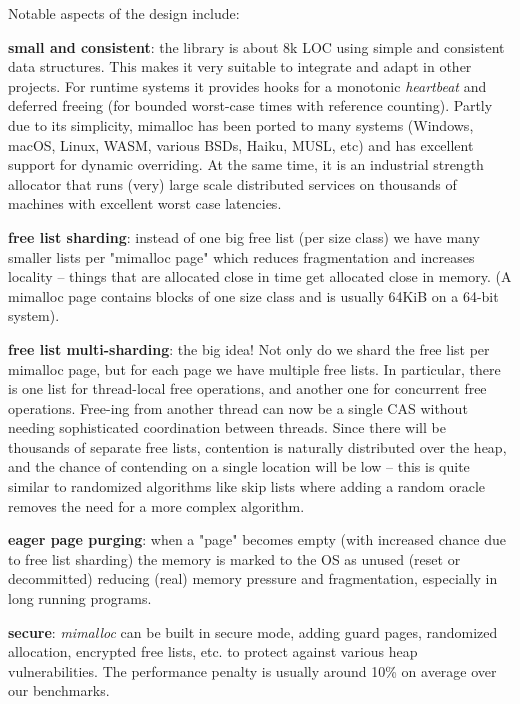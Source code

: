 Notable aspects of the design include\+:
\begin{DoxyItemize}
\item {\bfseries{small and consistent}}\+: the library is about 8k LOC using simple and consistent data structures. This makes it very suitable to integrate and adapt in other projects. For runtime systems it provides hooks for a monotonic {\itshape heartbeat} and deferred freeing (for bounded worst-\/case times with reference counting). Partly due to its simplicity, mimalloc has been ported to many systems (Windows, mac\+OS, Linux, WASM, various BSD\textquotesingle{}s, Haiku, MUSL, etc) and has excellent support for dynamic overriding. At the same time, it is an industrial strength allocator that runs (very) large scale distributed services on thousands of machines with excellent worst case latencies.
\item {\bfseries{free list sharding}}\+: instead of one big free list (per size class) we have many smaller lists per "{}mimalloc page"{} which reduces fragmentation and increases locality -- things that are allocated close in time get allocated close in memory. (A mimalloc page contains blocks of one size class and is usually 64KiB on a 64-\/bit system).
\item {\bfseries{free list multi-\/sharding}}\+: the big idea! Not only do we shard the free list per mimalloc page, but for each page we have multiple free lists. In particular, there is one list for thread-\/local {\ttfamily free} operations, and another one for concurrent {\ttfamily free} operations. Free-\/ing from another thread can now be a single CAS without needing sophisticated coordination between threads. Since there will be thousands of separate free lists, contention is naturally distributed over the heap, and the chance of contending on a single location will be low -- this is quite similar to randomized algorithms like skip lists where adding a random oracle removes the need for a more complex algorithm.
\item {\bfseries{eager page purging}}\+: when a "{}page"{} becomes empty (with increased chance due to free list sharding) the memory is marked to the OS as unused (reset or decommitted) reducing (real) memory pressure and fragmentation, especially in long running programs.
\item {\bfseries{secure}}\+: {\itshape mimalloc} can be built in secure mode, adding guard pages, randomized allocation, encrypted free lists, etc. to protect against various heap vulnerabilities. The performance penalty is usually around 10\% on average over our benchmarks.

\end{DoxyItemize}
